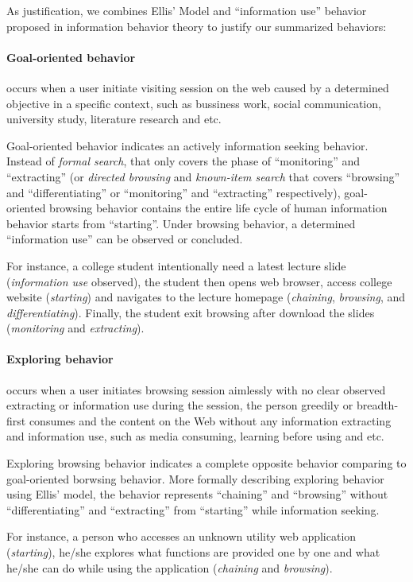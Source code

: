 As justification, we combines Ellis' Model and ``information use'' behavior proposed in
information behavior theory to justify our summarized behaviors:

\paragraph{Goal-oriented behavior} occurs when a user initiate 
visiting session on the web caused by a determined objective in a specific context, 
such as bussiness work, 
social communication, university study, literature research and etc. 

Goal-oriented behavior indicates an actively information seeking behavior.
Instead of \emph{formal search}, that only covers the phase of ``monitoring'' and ``extracting''
(or \emph{directed browsing} and \emph{known-item search} that covers ``browsing'' and ``differentiating'' or 
``monitoring'' and ``extracting'' respectively), 
goal-oriented browsing behavior contains the entire life cycle of human information behavior starts
from ``starting''. Under browsing behavior, a determined ``information use'' can be observed
or concluded.

For instance, a college student intentionally need a latest lecture slide (\emph{information use} observed), 
the student then opens web browser, access college website (\emph{starting}) and navigates to the lecture homepage 
(\emph{chaining}, \emph{browsing}, and \emph{differentiating}).
Finally, the student exit browsing after download the slides (\emph{monitoring} and \emph{extracting}).

\paragraph{Exploring behavior} occurs when a user initiates browsing session aimlessly with no clear observed
extracting or information use during the session, the person greedily or breadth-first consumes and the content on the Web without 
any information extracting and information use, such as media consuming, learning before using and etc.

Exploring browsing behavior indicates a complete opposite behavior comparing to 
goal-oriented borwsing behavior. More formally describing exploring behavior using Ellis' model, 
the behavior represents ``chaining'' and ``browsing''
without ``differentiating'' and ``extracting'' from ``starting'' while information seeking.

For instance, a person who accesses an unknown utility web application (\emph{starting}), he/she explores
what functions are provided one by one and what he/she can do while using the application
(\emph{chaining} and \emph{browsing}).

